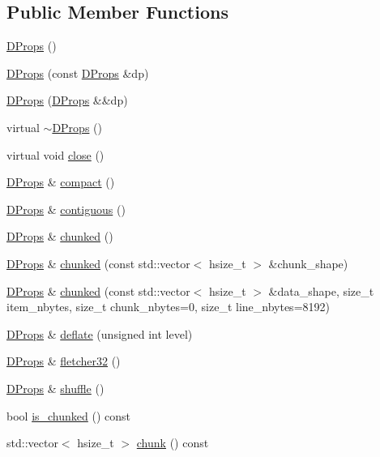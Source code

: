 \subsection*{Public Member Functions}
\begin{DoxyCompactItemize}
\item 
\hyperlink{class_h5_t_l_1_1_d_props_a8861717b78465e2b929a8f9822a25f91}{D\-Props} ()
\item 
\hyperlink{class_h5_t_l_1_1_d_props_a4477e3f09c8df3b9235cc59a6107d18b}{D\-Props} (const \hyperlink{class_h5_t_l_1_1_d_props}{D\-Props} \&dp)
\item 
\hyperlink{class_h5_t_l_1_1_d_props_a558ee807583c289f062942f91e6bfc39}{D\-Props} (\hyperlink{class_h5_t_l_1_1_d_props}{D\-Props} \&\&dp)
\item 
virtual \hyperlink{class_h5_t_l_1_1_d_props_af24985828926acc30de48fbf2351620f}{$\sim$\-D\-Props} ()
\item 
virtual void \hyperlink{class_h5_t_l_1_1_d_props_a4e6371b21d3b981b9813709a367f7c8a}{close} ()
\item 
\hyperlink{class_h5_t_l_1_1_d_props}{D\-Props} \& \hyperlink{class_h5_t_l_1_1_d_props_a4d9c048bbe6890fb8a76f42f5e41e02c}{compact} ()
\item 
\hyperlink{class_h5_t_l_1_1_d_props}{D\-Props} \& \hyperlink{class_h5_t_l_1_1_d_props_ae93cfa78bd2904d835be0ef8c01ac328}{contiguous} ()
\item 
\hyperlink{class_h5_t_l_1_1_d_props}{D\-Props} \& \hyperlink{class_h5_t_l_1_1_d_props_ab50eedeeb4f15976869e2314cda43f28}{chunked} ()
\item 
\hyperlink{class_h5_t_l_1_1_d_props}{D\-Props} \& \hyperlink{class_h5_t_l_1_1_d_props_ae0515ee98e2bcd02c55160a33a63aabf}{chunked} (const std\-::vector$<$ hsize\-\_\-t $>$ \&chunk\-\_\-shape)
\item 
\hyperlink{class_h5_t_l_1_1_d_props}{D\-Props} \& \hyperlink{class_h5_t_l_1_1_d_props_af1283799daeee775b41effb026792b79}{chunked} (const std\-::vector$<$ hsize\-\_\-t $>$ \&data\-\_\-shape, size\-\_\-t item\-\_\-nbytes, size\-\_\-t chunk\-\_\-nbytes=0, size\-\_\-t line\-\_\-nbytes=8192)
\item 
\hyperlink{class_h5_t_l_1_1_d_props}{D\-Props} \& \hyperlink{class_h5_t_l_1_1_d_props_aa6168baf2f7cc4e171f8c65ed2e7f0e3}{deflate} (unsigned int level)
\item 
\hyperlink{class_h5_t_l_1_1_d_props}{D\-Props} \& \hyperlink{class_h5_t_l_1_1_d_props_ae8ab837067c35b714b517f9cf08c6833}{fletcher32} ()
\item 
\hyperlink{class_h5_t_l_1_1_d_props}{D\-Props} \& \hyperlink{class_h5_t_l_1_1_d_props_adf68d5443694c5a28d089efaca1ccefc}{shuffle} ()
\item 
bool \hyperlink{class_h5_t_l_1_1_d_props_a3c5536e4dd3c26da5f0fd14b85929394}{is\-\_\-chunked} () const 
\item 
std\-::vector$<$ hsize\-\_\-t $>$ \hyperlink{class_h5_t_l_1_1_d_props_a881b1504af4a748112c0193ad712f058}{chunk} () const 
\end{DoxyCompactItemize}
